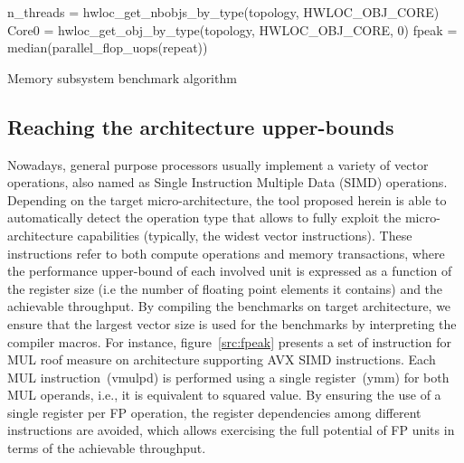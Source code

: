 \documentclass[twoside,twocolumn,8pt]{extarticle}
\begin{document}
\begin{algorithm}
 n\_threads = hwloc\_get\_nbobjs\_by\_type(topology, HWLOC\_OBJ\_CORE)\;
 Core0 = hwloc\_get\_obj\_by\_type(topology, HWLOC\_OBJ\_CORE, 0)\;
 fpeak = median(parallel\_flop\_uops(repeat))\;
 \caption{Memory subsystem benchmark algorithm}
 \label{alg:benchmarks}
\end{algorithm}


\subsection{Reaching the architecture upper-bounds}
\label{sub:arch_bounds}

Nowadays, general purpose processors usually implement a variety of vector operations, also named as Single Instruction Multiple
Data (SIMD) operations. Depending on the target micro-architecture,  the tool proposed herein is able to automatically detect the
operation type that allows to fully exploit the micro-architecture capabilities  (typically, the widest vector instructions). These
instructions refer to both compute operations and memory transactions, where the performance upper-bound of each involved unit is
expressed as a function of the register size (i.e the number of floating point  elements it contains) and the achievable
throughput. By compiling the benchmarks on target architecture, we ensure that the largest vector size is used for the benchmarks
by interpreting the compiler macros.
For instance, figure~\ref{src:fpeak} presents a set of instruction for MUL roof measure on architecture supporting AVX SIMD
instructions. Each MUL instruction~(vmulpd) is performed using a single register~(ymm) for both MUL operands, i.e., it is equivalent
to squared value. By ensuring the use of a single register per FP operation, the register dependencies among different instructions
are avoided, which allows exercising the full potential of FP units in terms of the achievable throughput.
\end{document}
